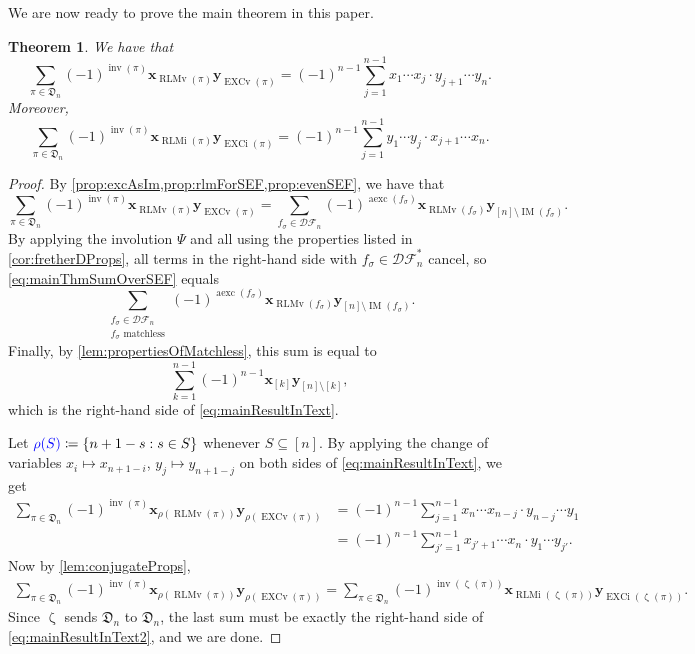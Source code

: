 \documentclass[reqno]{amsart}
\newtheorem{theorem}{Theorem}
\theoremstyle{definition}
\newcommand{\defin}[1]{%
\relax\ifmmode%
\textcolor{blue}{#1}%
\else\textcolor{blue}{\emph{#1}}%
\fi%
}
\newcommand{\xvec}{\mathbf{x}}
\newcommand{\yvec}{\mathbf{y}}
\newcommand{\dArr}{\mathfrak{D}}
\newcommand{\DSEF}{\mathcal{DF}}%
\newcommand{\frether}{\Psi}
\DeclareMathOperator{\inv}{inv}
\DeclareMathOperator{\EXCi}{EXCi}
\DeclareMathOperator{\EXCv}{EXCv}
\DeclareMathOperator{\RLMv}{RLMv}
\DeclareMathOperator{\RLMi}{RLMi}
\DeclareMathOperator{\aexc}{aexc} %
\DeclareMathOperator{\supp}{IM}
\DeclareMathOperator{\zetaMap}{\zeta}
\begin{document}
We are now ready to prove the main theorem in this paper.
\begin{theorem}\label{thm:theMainTheorem}
 We have that 
 \begin{equation}\label{eq:mainResultInText}
 \sum_{\pi \in \dArr_n} (-1)^{\inv(\pi)} 
 \xvec_{\RLMv(\pi)} \yvec_{ \EXCv(\pi)} 
 =
 (-1)^{n-1} \sum_{j=1}^{n-1} x_1 \dotsm x_j \cdot y_{j+1}\dotsm y_{n}.
 \end{equation} 
Moreover, 
 \begin{equation}\label{eq:mainResultInText2}
 \sum_{\pi \in \dArr_n} (-1)^{\inv(\pi)} 
 \xvec_{\RLMi(\pi)} 
 \yvec_{\EXCi(\pi)}
 =
 (-1)^{n-1} \sum_{j=1}^{n-1} y_1 \dotsm y_j \cdot x_{j+1}\dotsm x_{n}.
 \end{equation} 
\end{theorem}
\begin{proof}
By \cref{prop:excAsIm,prop:rlmForSEF,prop:evenSEF}, we have that
\begin{equation}\label{eq:mainThmSumOverSEF}
 \sum_{\pi \in \dArr_n} (-1)^{\inv(\pi)} 
 \xvec_{\RLMv(\pi)} \yvec_{ \EXCv(\pi)} 
 =
\sum_{f_\sigma \in \DSEF_n} (-1)^{\aexc(f_\sigma)} 
 \xvec_{\RLMv(f_\sigma)} \yvec_{[n] \setminus  \supp(f_\sigma)}. 
\end{equation}
By applying the involution $\frether$ and all 
using the properties listed in \cref{cor:fretherDProps},
all terms in the right-hand side with $f_\sigma \in \DSEF^*_n$
cancel, so \eqref{eq:mainThmSumOverSEF} equals
\begin{equation}
\sum_{\substack{ f_\sigma \in  \DSEF_n \\ \text{$f_\sigma$ matchless}}}
(-1)^{\aexc(f_\sigma)} \xvec_{\RLMv(f_\sigma)} \yvec_{[n] \setminus  \supp(f_\sigma)}. 
\end{equation}
Finally, by \cref{lem:propertiesOfMatchless}, this sum is equal to
\begin{equation}
\sum_{k=1}^{n-1}
(-1)^{n-1} \xvec_{[k]} \yvec_{[n] \setminus [k]},
\end{equation}
which is the right-hand side of \eqref{eq:mainResultInText}.
\medskip

Let $\defin{\rho(S)}\coloneqq \{n+1-s : s\in S\}$ whenever $S\subseteq [n]$.
By applying the change of variables
$x_i \mapsto x_{n+1-i}$, $y_j \mapsto y_{n+1-j}$ on both sides of 
\eqref{eq:mainResultInText}, we get
\begin{align*}
 \sum_{\pi \in \dArr_n} (-1)^{\inv(\pi)} 
 \xvec_{\rho(\RLMv(\pi))}
  \yvec_{\rho(\EXCv(\pi))}
&= (-1)^{n-1} \sum_{j=1}^{n-1} x_n \dotsm x_{n-j} \cdot y_{n-j}\dotsm y_{1} \\
&= (-1)^{n-1} \sum_{j'=1}^{n-1} x_{j'+1} \dotsm x_{n} \cdot y_{1}\dotsm y_{j'}.
\end{align*}
%
Now by \cref{lem:conjugateProps},
\begin{align*}
\sum_{\pi \in \dArr_n} (-1)^{\inv(\pi)} 
\xvec_{\rho(\RLMv(\pi))}
\yvec_{\rho(\EXCv(\pi))}
\!
=
\!
\sum_{\pi \in \dArr_n} (-1)^{\inv(\zetaMap(\pi))} 
\xvec_{\RLMi(\zetaMap(\pi))}
\yvec_{\EXCi(\zetaMap(\pi))}.
\end{align*}
Since $\zetaMap$ sends $\dArr_n$ to $\dArr_n$, 
the last sum must be exactly the right-hand side of \eqref{eq:mainResultInText2}, and we are done.
\end{proof}
\end{document}
